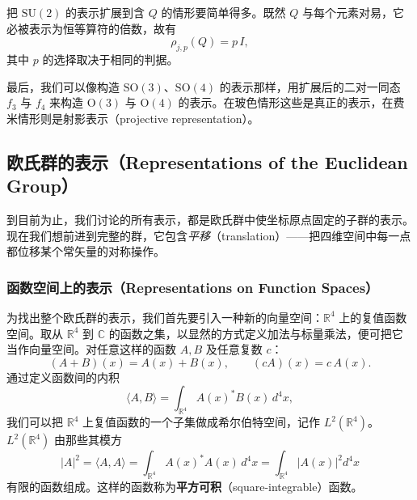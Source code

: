 把 $\mathrm{SU}(2)$ 的表示扩展到含 $Q$ 的情形要简单得多。既然 $Q$ 与每个元素对易，它必被表示为恒等算符的倍数，故有
\[
\rho_{j,p}(Q)=p\,I,
\]
其中 $p$ 的选择取决于相同的判据。

最后，我们可以像构造 $\mathrm{SO}(3)$、$\mathrm{SO}(4)$ 的表示那样，用扩展后的二对一同态 $f_3$ 与 $f_4$ 来构造 $\mathrm{O}(3)$ 与 $\mathrm{O}(4)$ 的表示。在玻色情形这些是真正的表示，在费米情形则是射影表示（projective representation）。

\subsection{欧氏群的表示（Representations of the Euclidean Group）}

到目前为止，我们讨论的所有表示，都是欧氏群中使坐标原点固定的子群的表示。现在我们想前进到完整的群，它包含\emph{平移}（translation）——把四维空间中每一点都位移某个常矢量的对称操作。

\subsubsection{函数空间上的表示（Representations on Function Spaces）}

为找出整个欧氏群的表示，我们首先要引入一种新的向量空间：$\mathbb{R}^4$ 上的复值函数空间。取从 $\mathbb{R}^4$ 到 $\mathbb{C}$ 的函数之集，以显然的方式定义加法与标量乘法，便可把它当作向量空间。对任意这样的函数 $A,B$ 及任意复数 $c$：
\[
(A+B)(x)=A(x)+B(x),\qquad (cA)(x)=c\,A(x).
\]
通过定义函数间的内积
\[
\langle A,B\rangle=\int_{\mathbb{R}^4}A(x)^* B(x)\,d^4x,
\]
我们可以把 $\mathbb{R}^4$ 上复值函数的一个子集做成希尔伯特空间，记作 $L^2(\mathbb{R}^4)$。$L^2(\mathbb{R}^4)$ 由那些其模方
\[
|A|^2=\langle A,A\rangle=\int_{\mathbb{R}^4}A(x)^* A(x)\,d^4x=\int_{\mathbb{R}^4}|A(x)|^2 d^4x
\]
有限的函数组成。这样的函数称为\textbf{平方可积}（square-integrable）函数。

